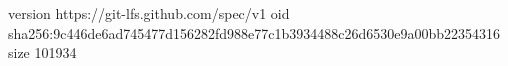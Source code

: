 version https://git-lfs.github.com/spec/v1
oid sha256:9c446de6ad745477d156282fd988e77c1b3934488c26d6530e9a00bb22354316
size 101934
